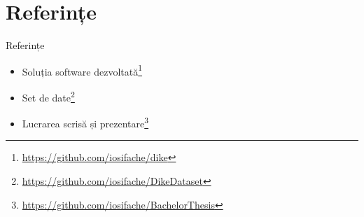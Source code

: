 \section{Referințe}

\begin{frame}{Referințe}
	\begin{itemize}
		\item Soluția software dezvoltată\footnote{\href{https://github.com/iosifache/dike}{https://github.com/iosifache/dike}}
		\item Set de date\footnote{\href{https://github.com/iosifache/DikeDataset}{https://github.com/iosifache/DikeDataset}}
		\item Lucrarea scrisă și prezentare\footnote{\href{https://github.com/iosifache/BachelorThesis}{https://github.com/iosifache/BachelorThesis}}
	\end{itemize}
\end{frame}